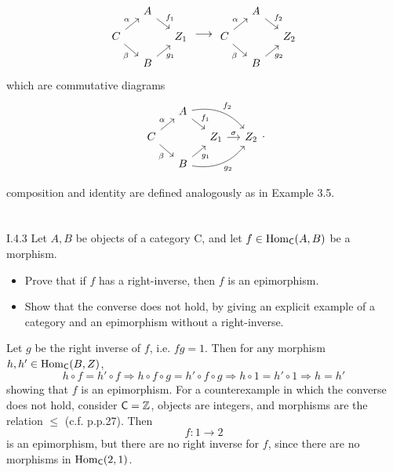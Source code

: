 \begin{sol}
\begin{itemize}
\[\begin{tikzcd}[column sep=small, row sep=small]
&A \arrow[dr, "f_1"] \\
C\arrow[ur, "\alpha"]\arrow[dr, "\beta"'] & &Z_1 \\
&B \arrow[ur, "g_1"']
\end{tikzcd}     
\longrightarrow
\begin{tikzcd}[column sep=small, row sep=small]
&A \arrow[dr, "f_2"] \\
C\arrow[ur, "\alpha"]\arrow[dr, "\beta"'] & &Z_2 \\
&B \arrow[ur, "g_2"']
\end{tikzcd}  
\]
which are commutative diagrams
\[
\begin{tikzcd}[column sep=small, row sep=small]
& A \arrow[rd, "f_1"] \arrow[rrd, bend left, "f_2"]  &  &   \\
C \arrow[ru, "\alpha"] \arrow[rd, "\beta"'] &  & Z_1 \arrow[r, "\sigma"] & Z_2 \\
& B \arrow[ru, "g_1"'] \arrow[rru, bend right, "g_2"'] &  &    
\end{tikzcd}.
\]
\end{itemize}
composition and identity are defined analogously as in Example 3.5. 
\end{sol}


\section{}
\begin{problem}{I.4.3}
Let $A,B$ be objects of a category \textsf{C}, and let $f \in \operatorname{Hom}_\mathsf{C}(A,B)$ be a morphism.
\begin{itemize}
\setlength\itemsep{0pt}
\item Prove that if $f$ has a right-inverse, then $f$ is an epimorphism.
\item Show that the converse does not hold, by giving an explicit example of a category and an epimorphism without a right-inverse.
\end{itemize}
\end{problem}
\begin{pf}
Let $g$ be the right inverse of $f$, i.e. $fg = 1$. Then for any morphism $h, h' \in \operatorname{Hom}_\mathsf{C}(B,Z)$,
\[
h \circ f = h' \circ f \Rightarrow h \circ f \circ g = h' \circ f \circ g \Rightarrow h \circ 1 = h' \circ 1 \Rightarrow h = h'
\]
showing that $f$ is an epimorphism. For a counterexample in which the converse does not hold, consider $\mathsf{C} = \mathbb{Z}$, objects are integers, and morphisms are the relation $\leq$ (c.f. p.p.27). Then
\[
f : 1 \to 2	
\]
is an epimorphism, but there are no right inverse for $f$, since there are no morphisms in $\operatorname{Hom}_\mathsf{C}(2,1)$.
\end{pf}

